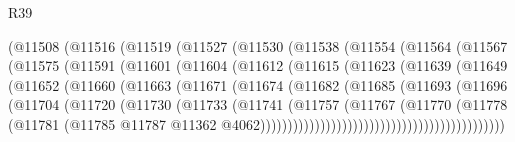 \begin{lexlean}{R39}
\begin{coremodule}
                  (@11508
                    (@11516
                      (@11519
                        (@11527
                          (@11530
                            (@11538
                              (@11554
                                (@11564
                                  (@11567
                                    (@11575
                                      (@11591
                                        (@11601
                                          (@11604
                                            (@11612
                                              (@11615
                                                (@11623
                                                  (@11639
                                                    (@11649
                                                      (@11652
                                                        (@11660
                                                          (@11663
                                                            (@11671
                                                              (@11674
                                                                (@11682
                                                                  (@11685
                                                                    (@11693
                                                                      (@11696
                                                                        (@11704
                                                                          (@11720
                                                                            (@11730
                                                                              (@11733
                                                                                (@11741
                                                                                  (@11757
                                                                                    (@11767
                                                                                      (@11770
                                                                                        (@11778
                                                                                          (@11781
                                                                                            (@11785
                                                                                              @11787
                                                                                              @11362
                                                                                              @4062)))))))))))))))))))))))))))))))))))))))))))))

\end{coremodule}
\end{lexlean}
